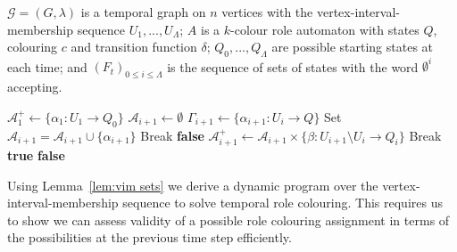 \documentclass[runningheads]{llncs}
\begin{document}
\begin{toappendix}
 \begin{algorithm}
 \caption{VIM- width algorithm}
        \label{alg:vim2}
        \begin{algorithmic}[1]
        \Require $\mathcal{G}=(G,\lambda)$ is a temporal graph on $n$ vertices with the vertex-interval-membership sequence $U_{1},...,U_\Lambda$;
        $A$ is a $k$-colour role automaton with states $Q$, colouring $c$ and transition function $\delta$; $Q_0,...,Q_\Lambda$ are possible starting states at each time; and $(F_t)_{0\leq i \leq \Lambda}$ is the sequence of sets of states with the word $\emptyset^i$  accepting.
        
    \State $\mathcal{A}^+_1 \gets\{\alpha_1:U_1 \rightarrow Q_0\}$
    \State $\mathcal{A}_{i+1} \gets \emptyset$
    \State $\Gamma_{i+1} \gets \{\alpha_{i+1}:U_{i} \rightarrow Q\}$
    \State Set $\mathcal{A}_{i+1}= \mathcal{A}_{i+1} \cup \{\alpha_{i+1}\}$
    \State Break 
    \EndIf
    \EndFor
    \EndFor
    \State \Return \textbf{false}
    \EndIf
    \State $\mathcal{A}_{i+1}^+\gets  \mathcal{A}_{i+1} \times \{\beta:U_{i+1}\setminus U_{i} \rightarrow Q_i\}$
    \EndFor
{}
\State Break
\EndIf
\EndFor
\State \Return \textbf{true}
\EndFor
\State \Return \textbf{false}

        \end{algorithmic}
        \end{algorithm}





\end{toappendix}


Using Lemma~\ref{lem:vim sets} we derive a dynamic program over the vertex-interval-membership sequence to solve temporal role colouring.
This requires us to show we can assess validity of a possible role colouring assignment in terms of the possibilities at the previous time step efficiently. 
\end{document}
